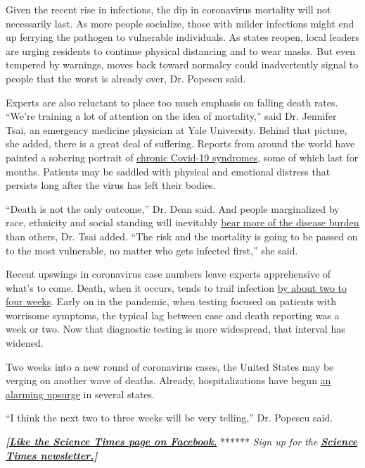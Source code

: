 Given the recent rise in infections, the dip in coronavirus mortality
will not necessarily last. As more people socialize, those with milder
infections might end up ferrying the pathogen to vulnerable individuals.
As states reopen, local leaders are urging residents to continue
physical distancing and to wear masks. But even tempered by warnings,
moves back toward normalcy could inadvertently signal to people that the
worst is already over, Dr. Popescu said.

Experts are also reluctant to place too much emphasis on falling death
rates. ``We're training a lot of attention on the idea of mortality,''
said Dr. Jennifer Tsai, an emergency medicine physician at Yale
University. Behind that picture, she added, there is a great deal of
suffering. Reports from around the world have painted a sobering
portrait of
\href{https://www.nytimes3xbfgragh.onion/2020/07/01/health/coronavirus-recovery-survivors.html}{chronic
Covid-19 syndromes}, some of which last for months. Patients may be
saddled with physical and emotional distress that persists long after
the virus has left their bodies.

``Death is not the only outcome,'' Dr. Dean said. And people
marginalized by race, ethnicity and social standing will inevitably
\href{https://www.cdc.gov/coronavirus/2019-ncov/covid-data/covidview/index.html}{bear
more of the disease burden} than others, Dr. Tsai added. ``The risk and
the mortality is going to be passed on to the most vulnerable, no matter
who gets infected first,'' she said.

Recent upswings in coronavirus case numbers leave experts apprehensive
of what's to come. Death, when it occurs, tends to trail infection
\href{https://www.cdc.gov/coronavirus/2019-ncov/hcp/clinical-guidance-management-patients.html}{by
about two to four weeks}. Early on in the pandemic, when testing focused
on patients with worrisome symptoms, the typical lag between case and
death reporting was a week or two. Now that diagnostic testing is more
widespread, that interval has widened.

Two weeks into a new round of coronavirus cases, the United States may
be verging on another wave of deaths. Already, hospitalizations have
begun
\href{https://www.washingtonpost.com/nation/2020/06/23/coronavirus-live-updates-us/}{an
alarming upsurge} in several states.

``I think the next two to three weeks will be very telling,'' Dr.
Popescu said.

\textbf{\emph{{[}}\href{http://on.fb.me/1paTQ1h}{\emph{Like the Science
Times page on Facebook.}}} ****** \emph{\textbar{} Sign up for the}
\textbf{\href{http://nyti.ms/1MbHaRU}{\emph{Science Times
newsletter.}}\emph{{]}}}

